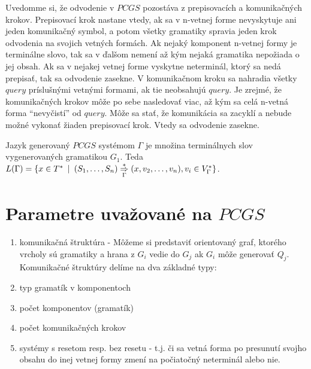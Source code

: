 Uvedomme si, že odvodenie v $PCGS$ pozostáva z prepisovacích a
komunikačných krokov. Prepisovací krok nastane vtedy, ak
sa v n-vetnej forme nevyskytuje ani jeden komunikačný symbol, a
potom všetky gramatiky spravia jeden krok odvodenia na svojich
vetných formách. Ak nejaký komponent n-vetnej formy je terminálne
slovo, tak sa v ďalšom nemení až kým nejaká gramatika nepožiada o
jej obsah. Ak sa v nejakej vetnej forme vyskytne neterminál, ktorý
sa nedá prepisať, tak sa odvodenie zasekne. V komunikačnom kroku
sa nahradia všetky $query$ príslušnými vetnými formami, ak tie
neobsahujú $query$. Je zrejmé, že komunikačných krokov môže po
sebe nasledovať viac, až kým sa celá n-vetná forma ``nevyčistí''
od $query$. Môže sa stať, že komunikácia sa zacyklí a nebude možné
vykonať žiaden prepisovací krok. Vtedy sa odvodenie zasekne.

\begin{definicia}
  Jazyk generovaný $PCGS$ systémom $\Gamma$ je množina terminálnych
  slov vygenerovaných gramatikou $G_1$. Teda
  $L(\Gamma)=\{x\in T^*\enspace |\enspace (S_1,\dots
  ,S_n)\overset{*}{\underset{\Gamma}{\Rightarrow}} (x,v_2,\dots ,v_n),v_i\in
  V_\Gamma^*\}$.
\end{definicia}

\section{Parametre uvažované na $PCGS$}

\begin{enumerate}
  \item komunikačná štruktúra - Môžeme si predstaviť orientovaný graf, ktorého
    vrcholy sú gramatiky a hrana z $G_i$ vedie do $G_j$ ak $G_i$ môže
    generovať $Q_j$. Komunikačné štruktúry delíme na dva základné
    typy:
  \item typ gramatík v komponentoch
  \item počet komponentov (gramatík)
  \item počet komunikačných krokov
  \item systémy s resetom resp. bez resetu - t.j. či sa vetná forma
    po presunutí svojho obsahu do inej vetnej formy zmení na
    počiatočný neterminál alebo nie.
\end{enumerate}

